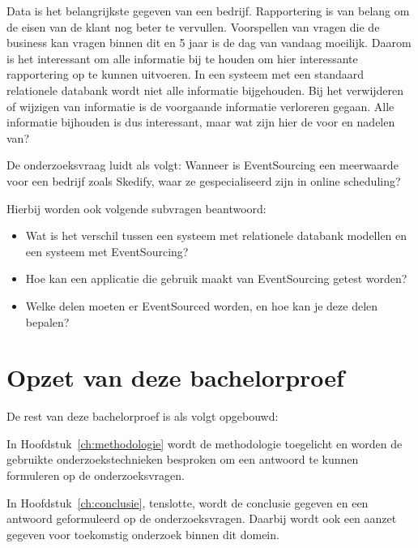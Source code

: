 Data is het belangrijkste gegeven van een bedrijf. Rapportering is van belang om de eisen van de klant nog beter te vervullen. Voorspellen van vragen die de business kan vragen binnen dit en 5 jaar is de dag van vandaag moeilijk. Daarom is het interessant om alle informatie bij te houden om hier interessante rapportering op te kunnen uitvoeren. In een systeem met een standaard relationele databank wordt niet alle informatie bijgehouden. Bij het verwijderen of wijzigen van informatie is de voorgaande informatie verloreren gegaan. Alle informatie bijhouden is dus interessant, maar wat zijn hier de voor en nadelen van?

De onderzoeksvraag luidt als volgt: Wanneer is EventSourcing een meerwaarde voor een bedrijf zoals Skedify, waar ze gespecialiseerd zijn in online scheduling?

Hierbij worden ook volgende subvragen beantwoord:

\begin{itemize}
    \item Wat is het verschil tussen een systeem met relationele databank modellen en een systeem met EventSourcing?
    \item Hoe kan een applicatie die gebruik maakt van EventSourcing getest worden?
    \item Welke delen moeten er EventSourced worden, en hoe kan je deze delen bepalen?
\end{itemize}

\section{Opzet van deze bachelorproef}
\label{sec:opzet-bachelorproef}


De rest van deze bachelorproef is als volgt opgebouwd:

In Hoofdstuk~\ref{ch:methodologie} wordt de methodologie toegelicht en worden de gebruikte onderzoekstechnieken besproken om een antwoord te kunnen formuleren op de onderzoeksvragen.


In Hoofdstuk~\ref{ch:conclusie}, tenslotte, wordt de conclusie gegeven en een antwoord geformuleerd op de onderzoeksvragen. Daarbij wordt ook een aanzet gegeven voor toekomstig onderzoek binnen dit domein.

